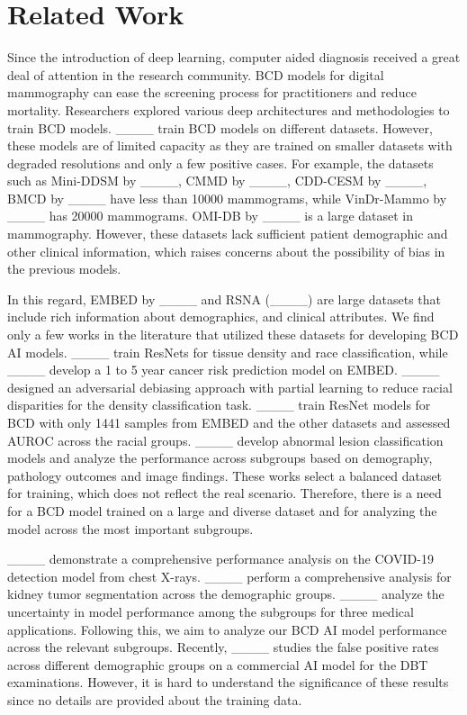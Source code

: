 \section{Related Work}
\label{related_work}
Since the introduction of deep learning, computer aided diagnosis received a great deal of attention in the research community. BCD models for digital mammography can ease the screening process for practitioners and reduce mortality. Researchers explored various deep architectures and methodologies to train BCD models. ____ train BCD models on different datasets. However, these models are of limited capacity as they are trained on smaller datasets with degraded resolutions and only a few positive cases. For example, the datasets such as Mini-DDSM by ____, CMMD by ____, CDD-CESM by ____, BMCD by ____ have less than 10000 mammograms, while VinDr-Mammo by ____ has 20000 mammograms. OMI-DB by ____ is a large dataset in mammography. However, these datasets lack sufficient patient demographic and other clinical information, which raises concerns about the possibility of bias in the previous models.  

In this regard, EMBED by ____ and RSNA (____) are large datasets that include rich information about demographics, and clinical attributes. We find only a few works in the literature that utilized these datasets for developing BCD AI models. 
____ train ResNets for tissue density and race classification, while
____ develop a 1 to 5 year cancer risk prediction model on EMBED. 
____ designed an adversarial debiasing approach with partial learning to reduce racial disparities for the density classification task.
____ train ResNet models for BCD with only 1441 samples from EMBED and the other datasets and assessed AUROC across the racial groups.
____ develop abnormal lesion classification models and analyze the performance across subgroups based on demography, pathology outcomes and image findings. These works select a balanced dataset for training, which does not reflect the real scenario. Therefore, there is a need for a BCD model trained on a large and diverse dataset and for analyzing the model across the most important subgroups.

____ demonstrate a comprehensive performance analysis on the COVID-19 detection model from chest X-rays. ____ perform a comprehensive analysis for kidney tumor segmentation across the demographic groups. ____ analyze the uncertainty in model performance among the subgroups for three medical applications. Following this, we aim to analyze our BCD AI model performance across the relevant subgroups. Recently, ____ studies the false positive rates across different demographic groups on a commercial AI model for the DBT examinations. However, it is hard to understand the significance of these results since no details are provided about the training data.

